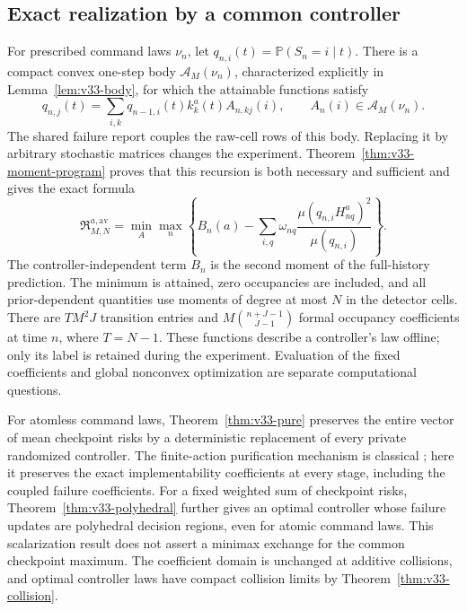 \subsection{Exact realization by a common controller}
For prescribed command laws $\nu_n$, let
$q_{n,i}(t)=\mathbb P(S_n=i\mid t)$. There is a compact convex
one-step body $\mathscr A_M(\nu_n)$, characterized explicitly in
Lemma~\ref{lem:v33-body}, for which the attainable functions satisfy
\[
 q_{n,j}(t)=\sum_{i,k}q_{n-1,i}(t)k_k^a(t)A_{n,kj}(i),
                       \qquad A_n(i)\in\mathscr A_M(\nu_n).
\]
The shared failure report couples the raw-cell rows of this body.
Replacing it by arbitrary stochastic matrices changes the experiment.
Theorem~\ref{thm:v33-moment-program} proves that this recursion is
both necessary and sufficient and gives the exact formula
\[
 \mathfrak R_{M,N}^{a,\mathrm{av}}
 =\min_A\max_n\left\{B_n(a)-
       \sum_{i,q}\omega_{nq}\frac{\mu(q_{n,i}H_{nq}^a)^2}
                                      {\mu(q_{n,i})}\right\}.
\]
The controller-independent term $B_n$ is the second moment of the
full-history prediction. The minimum is attained, zero occupancies
are included, and all prior-dependent quantities use moments of degree
at most $N$ in the detector cells. There are $TM^2J$ transition
entries and $M\binom{n+J-1}{J-1}$ formal occupancy coefficients at
time $n$, where $T=N-1$. These functions describe a controller's law
offline; only its label is retained during the experiment. Evaluation
of the fixed coefficients and global nonconvex optimization are
separate computational questions.

For atomless command laws, Theorem~\ref{thm:v33-pure} preserves the
entire vector of mean checkpoint risks by a deterministic replacement
of every private randomized controller. The finite-action purification
mechanism is classical \cite{DWW1951}; here it preserves the exact
implementability coefficients at every stage, including the coupled
failure coefficients. For a fixed weighted sum of checkpoint risks,
Theorem~\ref{thm:v33-polyhedral} further gives an optimal controller
whose failure updates are polyhedral decision regions, even for atomic
command laws. This scalarization result does not assert a minimax
exchange for the common checkpoint maximum. The coefficient domain
is unchanged at additive collisions, and optimal controller laws have
compact collision limits by Theorem~\ref{thm:v33-collision}.

